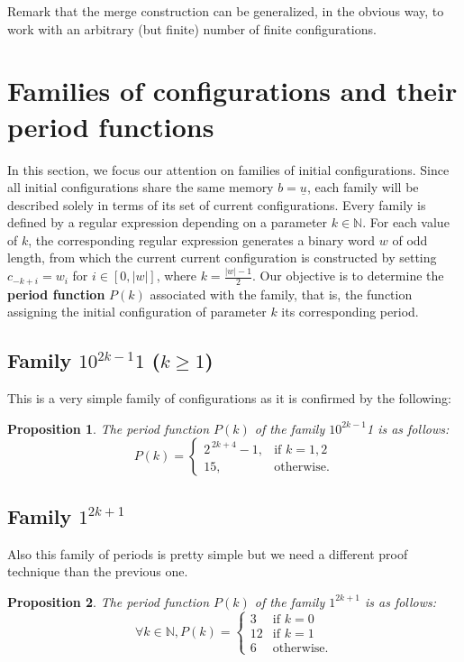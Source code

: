 \documentclass[submission,copyright,creativecommons]{eptcs}
\newcommand{\N}{\ensuremath{\mathbb{N}}\xspace}
\newcommand{\cu}{\ensuremath{\underline{u}}\xspace}
\newtheorem{proposition}{Proposition}
\begin{document}
Remark that the merge construction
can be generalized, in the obvious way,
to work with an arbitrary (but finite) number of finite configurations.


\section{Families of configurations and their period functions}
\label{sec:families}
%

In this section, we focus our attention on families of initial configurations. Since all initial configurations share the same memory $b=\cu$, each family will be described solely in terms of its set of current configurations. Every family is defined by a regular expression depending on a parameter $k\in\N$. For each value of $k$, the corresponding regular expression generates a binary word $w$ of odd length, from which the current current configuration is constructed by setting $c_{-k+i}=w_i$ for
$i\in[0,|w|]$, where $k=\frac{|w|-1}{2}$.
Our objective is to determine the \textbf{period function} $P(k)$ associated with the family, that is, the function assigning the initial configuration of parameter $k$ its corresponding period.

%
\subsection{Family $10^{2k-1}1$ ($k\geq1$)}
%
This is a very simple family of configurations as
it is confirmed by the following:
\begin{proposition}
\label{prop:family-10-pow(2k-1)1}
 The period function $P(k)$ of the family $10^{2k-1}$1 is as follows:
\[
P(k) =
\begin{cases}
2^{\,2k+4}-1,&\text{if\ } k=1,2\\[4pt]
15,&\text{otherwise}.
\end{cases}
\]    
\end{proposition}
%
\subsection{Family $1^{2k+1}$}
%
Also this family of periods is pretty simple
but we need a different proof technique than
the previous one.

\begin{proposition}
\label{prop:family-1pow(2k+1)}
 The period function $P(k)$ of the family $1^{2k+1}$ is as follows:
 \[
 \forall k\in\N, P(k)=  
 \begin{cases}
 3&\text{if\ }k=0\\
 12&\text{if\ }k=1\\
 6&\text{otherwise.}
 \end{cases}
 \]
\end{proposition}
%
\end{document}
